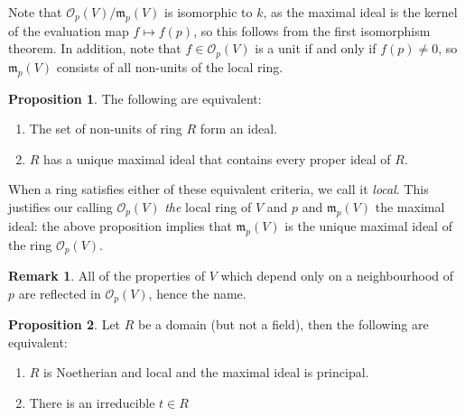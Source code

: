 \documentclass[aps,pra,showpacs,notitlepage,onecolumn,superscriptaddress,nofootinbib]{revtex4-1}
\theoremstyle{definition}
\newtheorem{remark}{Remark}[section]
\newtheorem{prop}{Proposition}[section]
\begin{document}
\noindent Note that $\mathcal{O}_p(V) / \mathfrak{m}_p(V)$ is isomorphic to $k$, as the maximal ideal is the kernel of the evaluation map $f \mapsto f(p)$,
so this follows from the first isomorphism theorem. In addition, note that $f \in \mathcal{O}_p(V)$ is a unit if and only if $f(p) \neq 0$, so $\mathfrak{m}_p(V)$
consists of all non-units of the local ring.

\begin{prop}
  The following are equivalent:
  \begin{enumerate}
    \item The set of non-units of ring $R$ form an ideal.
      \item $R$ has a unique maximal ideal that contains every proper ideal of $R$.
    \end{enumerate}
  \end{prop}

\noindent When a ring satisfies either of these equivalent criteria, we call it \emph{local}. This justifies our calling $\mathcal{O}_p(V)$ \emph{the} local ring of $V$ and $p$ and $\mathfrak{m}_p(V)$
the maximal ideal: the above proposition implies that $\mathfrak{m}_p(V)$ is the unique maximal ideal of the ring $\mathcal{O}_p(V)$.

\begin{remark}
  All of the properties of $V$ which depend only on a neighbourhood of $p$ are reflected in $\mathcal{O}_p(V)$, hence the name.
  \end{remark}

\begin{prop}
  Let $R$ be a domain (but not a field), then the following are equivalent:
  \begin{enumerate}
    \item $R$ is Noetherian and local and the maximal ideal is principal.
      \item There is an irreducible $t \in R$ 
    \end{enumerate}
  \end{prop}
\end{document}
